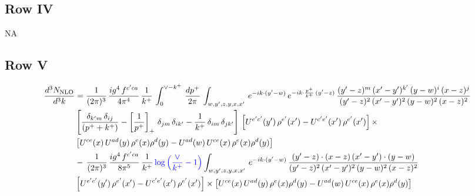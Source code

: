 \documentclass[9pt]{article}
\numberwithin{equation}{section}
\begin{document}
\subsection{Row IV}
\textsc{NA}
\subsection{Row V}
\begin{align}
    \frac{d^{3}N_{\rm NLO}}{d^{3}k} & = \frac{1}{(2\pi)^{3}}\, \frac{ig^{4}\,f^{c'ca}}{4\pi^{4}}\, \frac{1}{k^{+}}\,\int_{0}^{\vee-k^{+}}\, \frac{dp^{+}}{2\pi}\, \int_{w,y',z,y,x,x'}\, e^{-ik\cdot (y'-w)}\, e^{-ik\cdot \frac{p^{+}}{k^{+}}\,(y'-z)}\,\frac{(y'-z)^{m}\,(x'-y')^{k'}\,(y-w)^{i}\,(x-z)^{j}}{(y'-z)^{2}\,(x'-y')^{2}\,(y-w)^{2}\,(x-z)^{2}}\notag \\ & \left[\frac{\delta_{k'm}\,\delta_{ij}}{(p^{+}+k^{+})}-\left[\frac{1}{p^{+}}\right]_{+}\,\delta_{jm}\,\delta_{ik'}-\frac{1}{k^{+}}\, \delta_{im}\, \delta_{jk'}\right]\, \left[U^{e'c'}(y')\,\rho^{e'}(x')-U^{c'e'}(x')\,\rho^{e'}(x')\right]\times \notag \\ &  \left[U^{ce}(x)\,U^{ad}(y)\,\rho^{e}(x)\rho^{d}(y)-U^{ad}(w)\,U^{ce}(x)\,\rho^{e}(x)\rho^{d}(y)\right]\notag \\ & -\,\frac{1}{(2\pi)^{3}}\, \frac{ig^{4}\,f^{c'ca}}{8\pi^{5}}\, \frac{1}{k^{+}}\,{\color{blue}\log{\left(\frac{\vee}{k^{+}}-1\right)}} \int_{w,y',z,y,x,x'}\, e^{-ik\cdot (y'-w)}\,\frac{(y'-z)\cdot (x-z)\,(x'-y')\cdot (y-w)}{(y'-z)^{2}\,(x'-y')^{2}\,(y-w)^{2}\,(x-z)^{2}}\notag \\ & \left[U^{e'c'}(y')\,\rho^{e'}(x')-U^{c'e'}(x')\,\rho^{e'}(x')\right]\times  \left[U^{ce}(x)\,U^{ad}(y)\,\rho^{e}(x)\rho^{d}(y)-U^{ad}(w)\,U^{ce}(x)\,\rho^{e}(x)\rho^{d}(y)\right]
\end{align}
\end{document}
